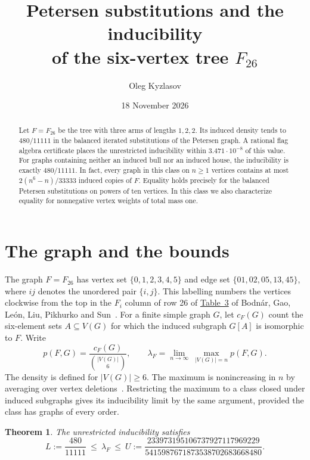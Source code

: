 \documentclass[11pt,a4paper]{article}
\title{\bfseries Petersen substitutions and the inducibility\\of the six-vertex tree \(F_{26}\)}
\author{Oleg Kyzlasov}
\date{18 November 2026}
\newtheorem{theorem}{Theorem}
\begin{document}
\maketitle
\begin{abstract}
Let \(F=F_{26}\) be the tree with three arms of lengths \(1,2,2\). Its induced density tends to \(480/11111\) in the balanced iterated substitutions of the Petersen graph. A rational flag algebra certificate places the unrestricted inducibility within \(3.471\cdot10^{-8}\) of this value. For graphs containing neither an induced bull nor an induced house, the inducibility is exactly \(480/11111\). In fact, every graph in this class on \(n\ge1\) vertices contains at most \(2(n^6-n)/33333\) induced copies of \(F\). Equality holds precisely for the balanced Petersen substitutions on powers of ten vertices. In this class we also characterize equality for nonnegative vertex weights of total mass one.
\end{abstract}

\section{The graph and the bounds}

The graph \(F=F_{26}\) has vertex set \(\{0,1,2,3,4,5\}\) and edge set
\(\{01,02,05,13,45\}\), where \(ij\) denotes the unordered pair \(\{i,j\}\).
This labelling numbers the vertices clockwise from the top in the \(F_i\) column of row 26 of \href{https://arxiv.org/html/2606.00290v3#S5.T3}{Table~3} of Bodn\'ar, Gao, Le\'on, Liu, Pikhurko and Sun~\cite{six}. For a finite simple graph \(G\), let \(c_F(G)\) count the six-element sets \(A\subseteq V(G)\) for which the induced subgraph \(G[A]\) is isomorphic to \(F\). Write
\[
 p(F,G)=\frac{c_F(G)}{\binom{|V(G)|}{6}},\qquad
 \lambda_F=\lim_{n\to\infty}\ \max_{|V(G)|=n}p(F,G).
\]
The density is defined for \(|V(G)|\ge6\). The maximum is nonincreasing in \(n\) by averaging over vertex deletions~\cite{pg}. Restricting the maximum to a class closed under induced subgraphs gives its inducibility limit by the same argument, provided the class has graphs of every order.

\begin{theorem}\label{th:global}
The unrestricted inducibility satisfies
\begin{equation}\label{eq:interval}
 L:=\frac{480}{11111}
 \ \le\ \lambda_F\ \le\
 U:=\frac{233973195106737927117969229}{5415987671873538702683668480}.
\end{equation}
\end{theorem}
\end{document}
